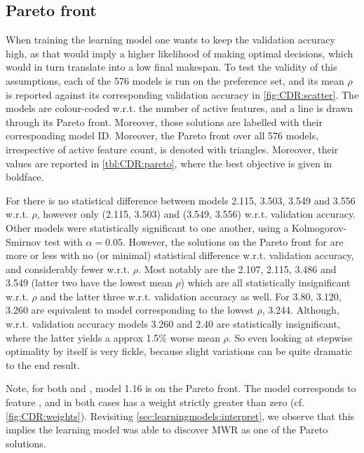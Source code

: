 \documentclass[smallextended]{svjour3}
\begin{document}
\subsection{Pareto front}\label{sec:CDR:pareto}
When training the learning model one wants to keep the validation accuracy 
high, as that would imply a higher likelihood of making optimal decisions, 
which would in turn translate into a low final makespan. To test the validity 
of this assumptions, each of the 576 models is run on the preference set, and 
its mean $\rho$ is reported against its corresponding validation accuracy in 
\cref{fig:CDR:scatter}. The models are colour-coded w.r.t. the number of active 
features, and a line is drawn through its Pareto front. Moreover, those 
solutions are labelled with their corresponding model ID. Moreover, the Pareto 
front over all 576 models, irrespective of active feature count, is denoted 
with triangles. Moreover, their values are reported in \cref{tbl:CDR:pareto}, 
where the best objective is given in boldface. 

For   there is no statistical difference between models 2.115, 
3.503, 3.549 and 3.556 w.r.t. $\rho$, however only (2.115, 3.503) and (3.549, 
3.556) w.r.t. validation accuracy. Other models were statistically significant 
to one another, using a Kolmogorov-Smirnov test with 
$\alpha=0.05$.\label{sec:expr:ks} 
However, the solutions on the Pareto front for  are more or less 
with no (or minimal) statistical difference w.r.t. validation accuracy, and 
considerably fewer w.r.t. $\rho$. Most notably are the 	2.107, 2.115, 3.486 
and 3.549 (latter two have the lowest mean $\rho$) which are all statistically 
insignificant w.r.t. $\rho$ and the latter three w.r.t. validation accuracy as 
well. 
For  3.80, 3.120, 3.260 are equivalent to model corresponding to 
the lowest $\rho$, 3.244. Although, w.r.t. validation accuracy models 3.260 and 
2.40 are statistically insignificant, where the latter yields a approx 1.5\% 
worse mean $\rho$. So even looking at stepwise optimality by itself is very 
fickle, because slight variations can be quite dramatic to the end result. 

Note, for both  and , model 1.16 is on the Pareto 
front. The model corresponds to feature \phiwrmJob, and in both cases has a 
weight strictly greater than zero (cf. \cref{fig:CDR:weights}). Revisiting 
\cref{sec:learningmodels:interpret}, we observe that this implies the learning 
model was able to discover MWR as one of the Pareto solutions. 
\end{document}

